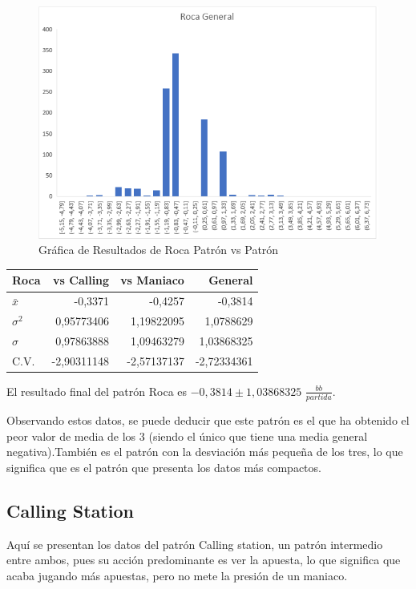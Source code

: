 \begin{figure}[h]
\centering
\includegraphics[width=.65\textwidth]{figuras/RG.png}   
\caption{Gráfica de Resultados de Roca  Patrón vs Patrón}
\label{fig:RGR}
\end{figure}


\begin{longtable}[c]{lrrr}
\hline
Roca & vs Calling & vs Maniaco & General \\ \hline
$\bar{x}$ & -0,3371 & -0,4257 & -0,3814 \\
$\sigma^2$ & 0,95773406 & 1,19822095 & 1,0788629 \\ 
$\sigma$ & 0,97863888 & 1,09463279 & 1,03868325 \\ 
C.V. & -2,90311148 & -2,57137137 & -2,72334361 \\ \hline
\end{longtable}

El resultado final del patrón Roca es $-0,3814\pm1,03868325$ $\frac{bb}{partida}$.

\smallskip

Observando estos datos, se puede deducir que este patrón es el que ha obtenido el peor valor de media de los 3 (siendo el único que tiene una media general negativa).También es el patrón con la desviación más pequeña de los tres, lo que significa que es el patrón que presenta los datos más compactos.

\newpage

\subsection{Calling Station}

Aquí se presentan los datos del patrón Calling station, un patrón intermedio entre ambos, pues su acción predominante es ver la apuesta, lo que significa que acaba jugando más apuestas, pero no mete la presión de un maniaco.

